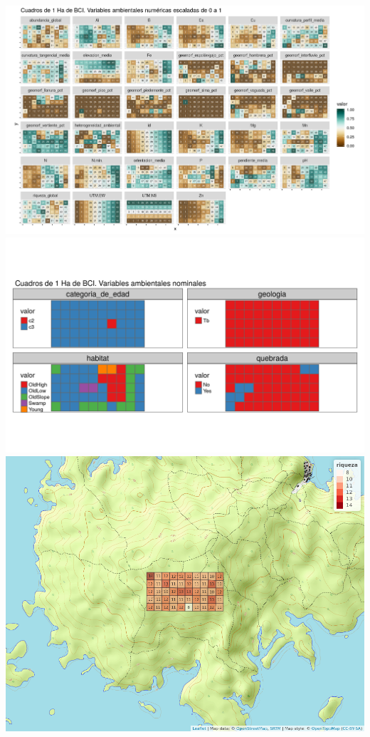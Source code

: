 \documentclass[11pt,]{article}
\begin{document}
\includegraphics[width=1.00000\textwidth]{mapas_variables_ambientales_numericas.png}
\includegraphics[width=1.00000\textwidth]{mapas_variables_ambientales_nominales_tmap.png}
\includegraphics[width=1.00000\textwidth]{mapa_cuadros_riq_mi_familia.png}
\end{document}

